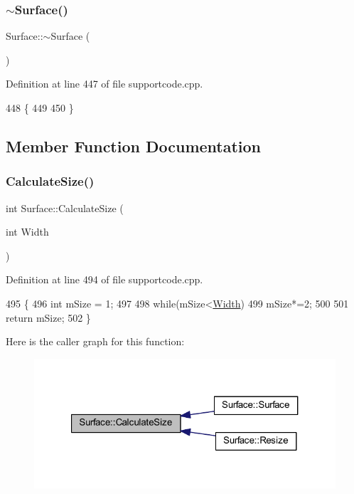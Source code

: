 \subsubsection{\texorpdfstring{$\sim$\+Surface()}{~Surface()}}
{\footnotesize\ttfamily Surface\+::$\sim$\+Surface (\begin{DoxyParamCaption}{ }\end{DoxyParamCaption})}



Definition at line 447 of file supportcode.\+cpp.


\begin{DoxyCode}
448 \{
449 
450 \}
\end{DoxyCode}


\subsection{Member Function Documentation}
\mbox{\label{class_surface_aeb8a8540f415a4d29c440667e8532e91}} 
\subsubsection{\texorpdfstring{Calculate\+Size()}{CalculateSize()}}
{\footnotesize\ttfamily int Surface\+::\+Calculate\+Size (\begin{DoxyParamCaption}\item[{int}]{Width }\end{DoxyParamCaption})}



Definition at line 494 of file supportcode.\+cpp.


\begin{DoxyCode}
495 \{
496     \textcolor{keywordtype}{int} mSize = 1;
497 
498     \textcolor{keywordflow}{while}(mSize<\hyperlink{class_surface_ae76d7c2fa208df6979a77cc60e8105c0}{Width})
499         mSize*=2;
500 
501     \textcolor{keywordflow}{return} mSize;
502 \}
\end{DoxyCode}
Here is the caller graph for this function\+:\nopagebreak
\begin{figure}[H]
\begin{center}
\leavevmode
\includegraphics[width=321pt]{class_surface_aeb8a8540f415a4d29c440667e8532e91_icgraph}
\end{center}
\end{figure}
\mbox{\label{class_surface_a8f8da8f3ee82b8e657916f40b3f40eff}} 
